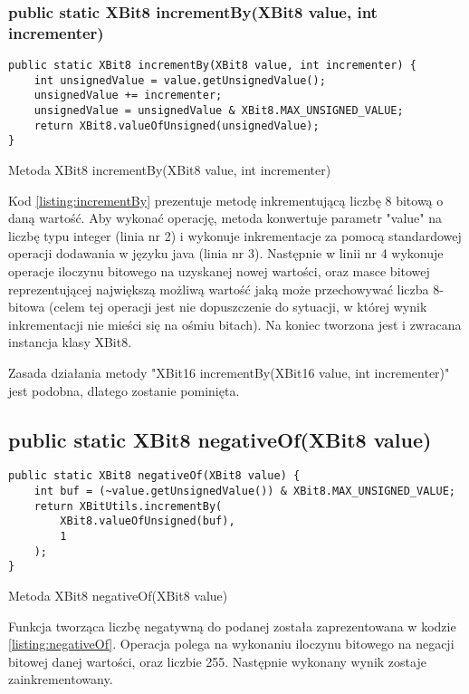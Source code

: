 	\subsubsection{public static XBit8 incrementBy(XBit8 value, int incrementer)}
	\begin{listing}[h]
		\begin{verbatim}
public static XBit8 incrementBy(XBit8 value, int incrementer) {
	int unsignedValue = value.getUnsignedValue();
	unsignedValue += incrementer;
	unsignedValue = unsignedValue & XBit8.MAX_UNSIGNED_VALUE;
	return XBit8.valueOfUnsigned(unsignedValue);
}
		\end{verbatim}
		\caption{Metoda XBit8 incrementBy(XBit8 value, int incrementer)}
		\label{listing:incrementBy}
	\end{listing}
	Kod \ref{listing:incrementBy} prezentuje metodę inkrementującą liczbę 8 bitową o daną wartość. Aby wykonać operację, metoda konwertuje parametr "value" na liczbę typu integer (linia nr 2) i wykonuje inkrementacje za pomocą standardowej operacji dodawania w języku java (linia nr 3). Następnie w linii nr 4 wykonuje operacje iloczynu bitowego na uzyskanej nowej wartości, oraz masce bitowej reprezentującej największą możliwą wartość jaką może przechowywać liczba 8-bitowa (celem tej operacji jest nie dopuszczenie do sytuacji, w której wynik inkrementacji nie mieści się na ośmiu bitach). Na koniec tworzona jest i zwracana instancja klasy XBit8. 
	
	Zasada działania metody "XBit16 incrementBy(XBit16 value, int incrementer)" jest podobna, dlatego zostanie pominięta.
		
	\subsection{public static XBit8 negativeOf(XBit8 value)}
	\begin{listing}[h]
		\begin{verbatim}
public static XBit8 negativeOf(XBit8 value) {
	int buf = (~value.getUnsignedValue()) & XBit8.MAX_UNSIGNED_VALUE;
	return XBitUtils.incrementBy(
		XBit8.valueOfUnsigned(buf),
		1
	);
}
		\end{verbatim}
		\caption{Metoda XBit8 negativeOf(XBit8 value)}
		\label{listing:negativeOf}
	\end{listing}
	Funkcja tworząca liczbę negatywną do podanej została zaprezentowana w kodzie \ref{listing:negativeOf}. Operacja polega na wykonaniu iloczynu bitowego na negacji bitowej danej wartości, oraz liczbie 255. Następnie wykonany wynik zostaje zainkrementowany. 
		
